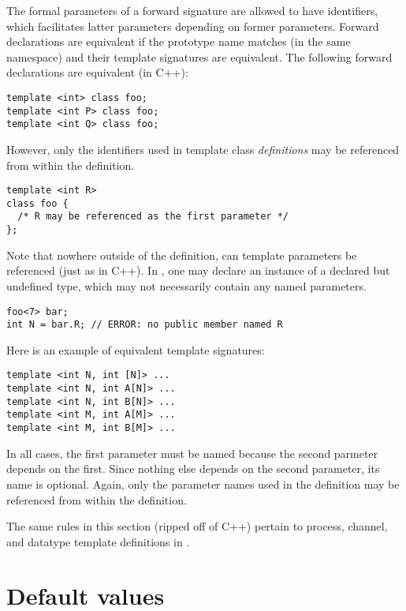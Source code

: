The formal parameters of a forward signature are allowed to have identifiers, 
which facilitates latter parameters depending on former parameters.  
Forward declarations are equivalent if the prototype name matches (in the
same namespace) and their template signatures are equivalent.  
The following forward declarations are equivalent (in C++):

\begin{verbatim}
template <int> class foo;
template <int P> class foo;
template <int Q> class foo;
\end{verbatim}

However, only the identifiers used in template class \emph{definitions}
may be referenced from within the definition.  

\begin{verbatim}
template <int R>
class foo {
  /* R may be referenced as the first parameter */
};
\end{verbatim}

Note that nowhere outside of the definition, 
can template parameters be referenced (just as in C++).  
In \artxx, one may declare an instance of a declared but undefined type, 
which may not necessarily contain any named parameters.  

\begin{verbatim}
foo<7> bar;
int N = bar.R; // ERROR: no public member named R
\end{verbatim}

Here is an example of equivalent template signatures:

\begin{verbatim}
template <int N, int [N]> ...
template <int N, int A[N]> ...
template <int N, int B[N]> ...
template <int M, int A[M]> ...
template <int M, int B[M]> ...
\end{verbatim}

In all cases, the first parameter must be named because the second
parmeter depends on the first.  
Since nothing else depends on the second parameter, its name is optional.  
Again, only the parameter names used in the definition 
may be referenced from within the definition.  

The same rules in this section (ripped off of C++) pertain to
process, channel, and datatype template definitions in \artxx.


\section{Default values}
\label{sec:templates:default}

